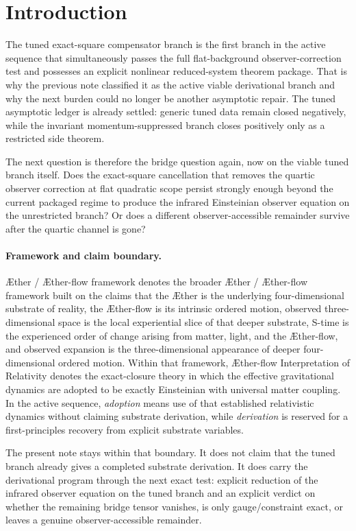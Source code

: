 \documentclass[11pt]{article}
\newcommand{\Aether}{\AE{}ther}
\newcommand{\Aflow}{\AE{}ther-flow}
\newcommand{\TheoryName}{\Aflow{} Interpretation of Relativity}
\newcommand{\TheoryProgram}{\Aether{} / \Aflow{} framework}
\begin{document}
\section{Introduction}

The tuned exact-square compensator branch is the first branch in the active sequence that simultaneously passes the full flat-background observer-correction test and possesses an explicit nonlinear reduced-system theorem package. That is why the previous note classified it as the active viable derivational branch and why the next burden could no longer be another asymptotic repair. The tuned asymptotic ledger is already settled: generic tuned data remain closed negatively, while the invariant momentum-suppressed branch closes positively only as a restricted side theorem.

The next question is therefore the bridge question again, now on the viable tuned branch itself. Does the exact-square cancellation that removes the quartic observer correction at flat quadratic scope persist strongly enough beyond the current packaged regime to produce the infrared Einsteinian observer equation on the unrestricted branch? Or does a different observer-accessible remainder survive after the quartic channel is gone?

\paragraph{Framework and claim boundary.}
\TheoryProgram{} denotes the broader \Aether{} / \Aflow{} framework built on the claims that the \Aether{} is the underlying four-dimensional substrate of reality, the \Aflow{} is its intrinsic ordered motion, observed three-dimensional space is the local experiential slice of that deeper substrate, S-time is the experienced order of change arising from matter, light, and the \Aflow{}, and observed expansion is the three-dimensional appearance of deeper four-dimensional ordered motion. Within that framework, \TheoryName{} denotes the exact-closure theory in which the effective gravitational dynamics are adopted to be exactly Einsteinian with universal matter coupling. In the active sequence, \emph{adoption} means use of that established relativistic dynamics without claiming substrate derivation, while \emph{derivation} is reserved for a first-principles recovery from explicit substrate variables.

The present note stays within that boundary. It does not claim that the tuned branch already gives a completed substrate derivation. It does carry the derivational program through the next exact test: explicit reduction of the infrared observer equation on the tuned branch and an explicit verdict on whether the remaining bridge tensor vanishes, is only gauge/constraint exact, or leaves a genuine observer-accessible remainder.
\end{document}
